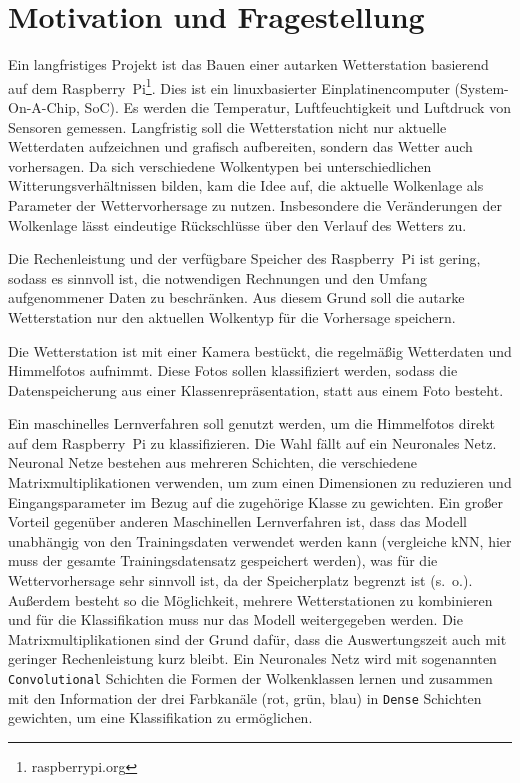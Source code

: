 \newpage
{}

\hypertarget{einleitung-motivation-fragestellung}{%
\section{Motivation und Fragestellung}\label{einleitung-motivation-fragestellung}}

Ein langfristiges Projekt ist das Bauen einer autarken Wetterstation
basierend auf dem Raspberry~Pi\footnote{raspberrypi.org}. Dies ist ein
linuxbasierter Einplatinencomputer (System-On-A-Chip, SoC). Es werden
die Temperatur, Luftfeuchtigkeit und Luftdruck von Sensoren gemessen.
Langfristig soll die Wetterstation nicht nur aktuelle Wetterdaten
aufzeichnen und grafisch aufbereiten, sondern das Wetter auch
vorhersagen. Da sich verschiedene Wolkentypen bei unterschiedlichen
Witterungsverhältnissen bilden, kam die Idee auf, die aktuelle
Wolkenlage als Parameter der Wettervorhersage zu nutzen. Insbesondere
die Veränderungen der Wolkenlage lässt eindeutige Rückschlüsse über den
Verlauf des Wetters zu.

Die Rechenleistung und der verfügbare Speicher des Raspberry~Pi ist
gering, sodass es sinnvoll ist, die notwendigen Rechnungen und den
Umfang aufgenommener Daten zu beschränken. Aus diesem Grund soll die
autarke Wetterstation nur den aktuellen Wolkentyp für die Vorhersage
speichern.

Die Wetterstation ist mit einer Kamera bestückt, die regelmäßig
Wetterdaten und Himmelfotos aufnimmt. Diese Fotos sollen klassifiziert
werden, sodass die Datenspeicherung aus einer Klassenrepräsentation,
statt aus einem Foto besteht.

Ein maschinelles Lernverfahren soll genutzt werden, um die Himmelfotos
direkt auf dem Raspberry~Pi zu klassifizieren. Die Wahl fällt auf ein
Neuronales Netz. Neuronal Netze bestehen aus mehreren Schichten, die
verschiedene Matrixmultiplikationen verwenden, um zum einen Dimensionen
zu reduzieren und Eingangsparameter im Bezug auf die zugehörige Klasse
zu gewichten. Ein großer Vorteil gegenüber anderen Maschinellen
Lernverfahren ist, dass das Modell unabhängig von den Trainingsdaten
verwendet werden kann (vergleiche kNN, hier muss der gesamte
Trainingsdatensatz gespeichert werden), was für die Wettervorhersage
sehr sinnvoll ist, da der Speicherplatz begrenzt ist (s.~o.). Außerdem
besteht so die Möglichkeit, mehrere Wetterstationen zu kombinieren und
für die Klassifikation muss nur das Modell weitergegeben werden. Die
Matrixmultiplikationen sind der Grund dafür, dass die Auswertungszeit
auch mit geringer Rechenleistung kurz bleibt. Ein Neuronales Netz wird
mit sogenannten \texttt{Convolutional} Schichten die Formen der
Wolkenklassen lernen und zusammen mit den Information der drei
Farbkanäle (rot, grün, blau) in \texttt{Dense} Schichten gewichten, um
eine Klassifikation zu ermöglichen.


